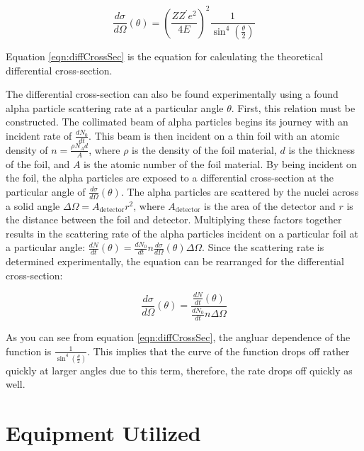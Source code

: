\documentclass[a4paper]{article}
\begin{document}
\begin{equation}
  \frac{d\sigma}{d\Omega} (\theta) = \left( \frac{Z Z^{\prime} e^2}{4 E}
  \right)^2 \frac{1}{\sin^4 \left( \frac{\theta}{2} \right)}
\end{equation}
\label{eqn:diffCrossSec}

Equation \ref{eqn:diffCrossSec} is the equation for calculating the
theoretical differential cross-section.

\qq The differential cross-section can also be found experimentally using a
found alpha particle scattering rate at a particular angle \( \theta \). First,
this relation must be constructed. The collimated beam of alpha particles begins
its journey with an incident rate of \( \frac{dN_0}{dt} \). This beam is then
incident on a thin foil with an atomic density of
\( n = \frac{\rho N_A d}{A} \), where \( \rho \) is the density of the foil
material, \( d \) is the thickness of the foil, and \( A \) is the atomic number
of the foil material. By being incident on the foil, the alpha particles are
exposed to a differential cross-section at the particular angle of
\( \frac{d\sigma}{d\Omega} (\theta) \). The alpha particles are scattered by the
nuclei across a solid angle \( \Delta \Omega = {A_{\text{detector}}}{r^2} \),
where \( A_{\text{detector}} \) is the area of the detector and \( r \) is the
distance between the foil and detector. Multiplying these factors together
results in the scattering rate of the alpha particles incident on a particular
foil at a particular angle: \( \frac{dN}{dt} (\theta) = \frac{dN_0}{dt} n
\frac{d\sigma}{d\Omega} (\theta) \Delta \Omega \). Since the scattering rate is
determined experimentally, the equation can be rearranged for the differential
cross-section:

\begin{equation}
  \frac{d\sigma}{d\Omega} (\theta) = \frac{\frac{dN}{dt}
    (\theta)}{\frac{dN_0}{dt} n \Delta \Omega}
\end{equation}
\label{eqn:expDiffCrossSec}


\qq As you can see from equation \ref{eqn:diffCrossSec}, the angluar
dependence of the function is $\frac{1}{\sin^4 \left( \frac{\theta}{2}
  \right)}$. This implies that the curve of the function drops off
rather quickly at larger angles due to this term, therefore, the rate
drops off quickly as well.

\section{Equipment Utilized}
\end{document}
